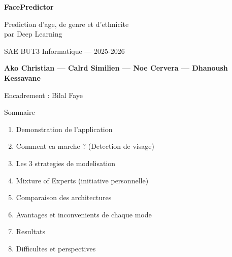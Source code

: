 \documentclass[aspectratio=169, 12pt]{beamer}
\begin{document}
\begin{frame}[plain]
\vfill
\begin{center}
{\Huge\bfseries\color{navy} FacePredictor}

\vspace{0.4cm}
{\large\color{steel} Prediction d'age, de genre et d'ethnicite\\par Deep Learning}

\vspace{1cm}
{\normalsize SAE BUT3 Informatique --- 2025-2026}

\vspace{0.5cm}
{\color{navy}\textbf{Ako Christian --- Calrd Similien --- Noe Cervera --- Dhanoush Kessavane}}

\vspace{0.4cm}
{\small\color{steel} Encadrement : Bilal Faye}
\end{center}
\vfill
\end{frame}

\begin{frame}{Sommaire}
\begin{enumerate}
\setlength{\itemsep}{10pt}
    \item Demonstration de l'application
    \item Comment ca marche ? (Detection de visage)
    \item Les 3 strategies de modelisation
    \item Mixture of Experts (initiative personnelle)
    \item Comparaison des architectures
    \item Avantages et inconvenients de chaque mode
    \item Resultats
    \item Difficultes et perspectives
\end{enumerate}
\end{frame}
\end{document}
